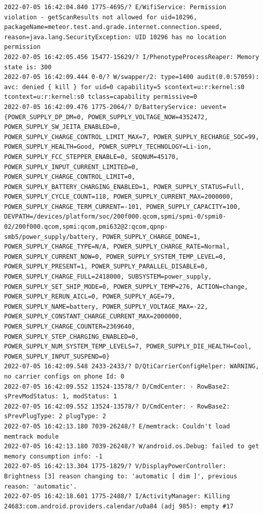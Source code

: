 \documentclass[a4paper,12pt]{book}
\begin{document}
\begin{lstlisting}
2022-07-05 16:42:04.840 1775-4695/? E/WifiService: Permission violation - getScanResults not allowed for uid=10296, packageName=meteor.test.and.grade.internet.connection.speed, reason=java.lang.SecurityException: UID 10296 has no location permission
2022-07-05 16:42:05.456 15477-15629/? I/PhenotypeProcessReaper: Memory state is: 300
2022-07-05 16:42:09.444 0-0/? W/swapper/2: type=1400 audit(0.0:57059): avc: denied { kill } for uid=0 capability=5 scontext=u:r:kernel:s0 tcontext=u:r:kernel:s0 tclass=capability permissive=0
2022-07-05 16:42:09.476 1775-2064/? D/BatteryService: uevent={POWER_SUPPLY_DP_DM=0, POWER_SUPPLY_VOLTAGE_NOW=4352472, POWER_SUPPLY_SW_JEITA_ENABLED=0, POWER_SUPPLY_CHARGE_CONTROL_LIMIT_MAX=7, POWER_SUPPLY_RECHARGE_SOC=99, POWER_SUPPLY_HEALTH=Good, POWER_SUPPLY_TECHNOLOGY=Li-ion, POWER_SUPPLY_FCC_STEPPER_ENABLE=0, SEQNUM=45170, POWER_SUPPLY_INPUT_CURRENT_LIMITED=0, POWER_SUPPLY_CHARGE_CONTROL_LIMIT=0, POWER_SUPPLY_BATTERY_CHARGING_ENABLED=1, POWER_SUPPLY_STATUS=Full, POWER_SUPPLY_CYCLE_COUNT=118, POWER_SUPPLY_CURRENT_MAX=2000000, POWER_SUPPLY_CHARGE_TERM_CURRENT=-101, POWER_SUPPLY_CAPACITY=100, DEVPATH=/devices/platform/soc/200f000.qcom,spmi/spmi-0/spmi0-02/200f000.qcom,spmi:qcom,pmi632@2:qcom,qpnp-smb5/power_supply/battery, POWER_SUPPLY_CHARGE_DONE=1, POWER_SUPPLY_CHARGE_TYPE=N/A, POWER_SUPPLY_CHARGE_RATE=Normal, POWER_SUPPLY_CURRENT_NOW=0, POWER_SUPPLY_SYSTEM_TEMP_LEVEL=0, POWER_SUPPLY_PRESENT=1, POWER_SUPPLY_PARALLEL_DISABLE=0, POWER_SUPPLY_CHARGE_FULL=2418000, SUBSYSTEM=power_supply, POWER_SUPPLY_SET_SHIP_MODE=0, POWER_SUPPLY_TEMP=276, ACTION=change, POWER_SUPPLY_RERUN_AICL=0, POWER_SUPPLY_AGE=79, POWER_SUPPLY_NAME=battery, POWER_SUPPLY_VOLTAGE_MAX=-22, POWER_SUPPLY_CONSTANT_CHARGE_CURRENT_MAX=2000000, POWER_SUPPLY_CHARGE_COUNTER=2369640, POWER_SUPPLY_STEP_CHARGING_ENABLED=0, POWER_SUPPLY_NUM_SYSTEM_TEMP_LEVELS=7, POWER_SUPPLY_DIE_HEALTH=Cool, POWER_SUPPLY_INPUT_SUSPEND=0}
2022-07-05 16:42:09.548 2433-2433/? D/QtiCarrierConfigHelper: WARNING, no carrier configs on phone Id: 0
2022-07-05 16:42:09.552 13524-13578/? D/CmdCenter: - RowBase2: sPrevModStatus: 1, modStatus: 1
2022-07-05 16:42:09.552 13524-13578/? D/CmdCenter: - RowBase2: sPrevPlugType: 2 plugType: 2
2022-07-05 16:42:13.180 7039-26248/? E/memtrack: Couldn't load memtrack module
2022-07-05 16:42:13.180 7039-26248/? W/android.os.Debug: failed to get memory consumption info: -1
2022-07-05 16:42:13.304 1775-1829/? V/DisplayPowerController: Brightness [3] reason changing to: 'automatic [ dim ]', previous reason: 'automatic'.
2022-07-05 16:42:18.601 1775-2488/? I/ActivityManager: Killing 24683:com.android.providers.calendar/u0a84 (adj 985): empty #17

\end{lstlisting}
\end{document}
